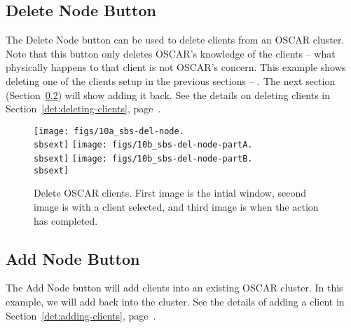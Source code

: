 
\subsection{Delete Node Button}
\label{app:sbs-delete-node}

The Delete Node button can be used to delete clients from an OSCAR
cluster.  Note that this button only deletes OSCAR's knowledge of the
clients -- what physically happens to that client is not OSCAR's
concern.  This example shows deleting one of the clients setup in the
previous sections -- .  The next section
(Section~\ref{app:sbs-add-node}) will show adding it back.  See the
details on deleting clients in Section~\ref{det:deleting-clients},
page~\pageref{det:deleting-clients}.

\begin{figure}[h!]
  \begin{center}
    \centerline{
      \texttt{[image: figs/10a\_sbs-del-node.\\sbsext]}
      \hspace{\imghskip}
      \texttt{[image: figs/10b\_sbs-del-node-partA.\\sbsext]}
      \hspace{\imghskip}
      \texttt{[image: figs/10b\_sbs-del-node-partB.\\sbsext]}
      }
    \caption[Delete OSCAR Clients.]{Delete OSCAR clients.  First image
    is the intial window, second image is with a client selected, and
    third image is when the action has completed.}
    \label{fig:sbs-del-node1}
  \end{center}
\end{figure}



\subsection{Add Node Button}
\label{app:sbs-add-node}

The Add Node button will add clients into an existing OSCAR cluster.
In this example, we will add back  into the
cluster.  See the details of adding a client in
Section~\ref{det:adding-clients}, page~\pageref{det:adding-clients}.

